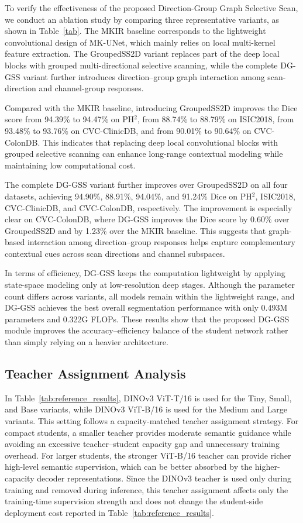 To verify the effectiveness of the proposed Direction-Group Graph Selective Scan, we conduct an ablation study by comparing three representative variants, as shown in Table~\ref{tab}. The MKIR baseline corresponds to the lightweight convolutional design of MK-UNet, which mainly relies on local multi-kernel feature extraction. The GroupedSS2D variant replaces part of the deep local blocks with grouped multi-directional selective scanning, while the complete DG-GSS variant further introduces direction--group graph interaction among scan-direction and channel-group responses.

Compared with the MKIR baseline, introducing GroupedSS2D improves the Dice score from 94.39\% to 94.47\% on PH$^2$, from 88.74\% to 88.79\% on ISIC2018, from 93.48\% to 93.76\% on CVC-ClinicDB, and from 90.01\% to 90.64\% on CVC-ColonDB. This indicates that replacing deep local convolutional blocks with grouped selective scanning can enhance long-range contextual modeling while maintaining low computational cost.

The complete DG-GSS variant further improves over GroupedSS2D on all four datasets, achieving 94.90\%, 88.91\%, 94.04\%, and 91.24\% Dice on PH$^2$, ISIC2018, CVC-ClinicDB, and CVC-ColonDB, respectively. The improvement is especially clear on CVC-ColonDB, where DG-GSS improves the Dice score by 0.60\% over GroupedSS2D and by 1.23\% over the MKIR baseline. This suggests that graph-based interaction among direction--group responses helps capture complementary contextual cues across scan directions and channel subspaces.

In terms of efficiency, DG-GSS keeps the computation lightweight by applying state-space modeling only at low-resolution deep stages. Although the parameter count differs across variants, all models remain within the lightweight range, and DG-GSS achieves the best overall segmentation performance with only 0.493M parameters and 0.322G FLOPs. These results show that the proposed DG-GSS module improves the accuracy--efficiency balance of the student network rather than simply relying on a heavier architecture.



\subsection{Teacher Assignment Analysis}

In Table~\ref{tab:reference_results}, DINOv3 ViT-T/16 is used for the Tiny, Small, and Base variants, while DINOv3 ViT-B/16 is used for the Medium and Large variants. This setting follows a capacity-matched teacher assignment strategy. For compact students, a smaller teacher provides moderate semantic guidance while avoiding an excessive teacher--student capacity gap and unnecessary training overhead. For larger students, the stronger ViT-B/16 teacher can provide richer high-level semantic supervision, which can be better absorbed by the higher-capacity decoder representations. Since the DINOv3 teacher is used only during training and removed during inference, this teacher assignment affects only the training-time supervision strength and does not change the student-side deployment cost reported in Table~\ref{tab:reference_results}.
